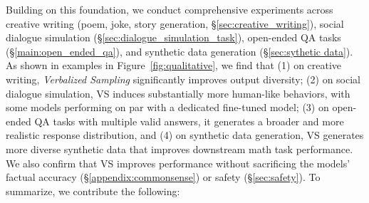 Building on this foundation, we conduct comprehensive experiments across creative writing (poem, joke, story generation, \S\ref{sec:creative_writing}), social dialogue simulation (\S\ref{sec:dialogue_simulation_task}), open-ended QA tasks (\S\ref{main:open_ended_qa}), and synthetic data generation (\S\ref{sec:sythetic data}). As shown in examples in Figure~\ref{fig:qualitative}, 
we find that (1) on creative writing, \emph{Verbalized Sampling} significantly improves output diversity; (2) on social dialogue simulation, VS induces substantially more human-like behaviors, with some models performing on par with a dedicated fine-tuned model; 
(3) on open-ended QA tasks with multiple valid answers, it generates a broader and more realistic response distribution, and (4) on synthetic data generation, VS generates more diverse synthetic data that improves downstream math task performance. We also confirm that VS improves performance without sacrificing the models' factual accuracy (\S\ref{appendix:commonsense}) or safety (\S\ref{sec:safety}). To summarize, we contribute the following: %
